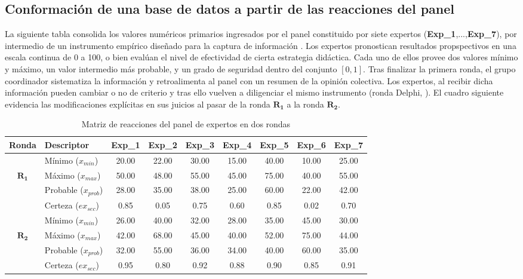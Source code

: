 \documentclass[11pt,a4paper]{article}
\begin{document}
\subsection{Conformación de una base de datos a partir de las reacciones del panel}
La siguiente tabla consolida los valores numéricos primarios ingresados por el panel constituido por siete expertos (\textbf{Exp\_1},...,\textbf{Exp\_7}), por intermedio de un instrumento empírico diseñado para la captura de información \cite{cruz2021}. Los expertos pronostican resultados propspectivos en una escala continua de 0 a 100, o bien evalúan el nivel de efectividad de cierta estrategia didáctica. Cada uno de ellos provee dos valores mínimo y máximo, un valor intermedio más probable, y un grado de seguridad dentro del conjunto $[0,1]$. Tras finalizar la primera ronda, el grupo coordinador sistematiza la información y retroalimenta al panel con un resumen de la opinión colectiva. Los expertos, al recibir dicha información pueden cambiar o no de criterio y tras ello vuelven a diligenciar el mismo instrumento (ronda Delphi, \cite{cruz2009}). El cuadro siguiente evidencia las modificaciones explícitas en sus juicios al pasar de la ronda $\mathbf{R_1}$ a la ronda $\mathbf{R_2}$.

\begin{table}[htbp]
\centering
\small
\begin{tabular}{clccccccc}
\toprule
\textbf{Ronda} & \textbf{Descriptor} & \textbf{Exp\_1} & \textbf{Exp\_2} & \textbf{Exp\_3} & \textbf{Exp\_4} & \textbf{Exp\_5} & \textbf{Exp\_6} & \textbf{Exp\_7} \\
\midrule
& Mínimo ($x_{min}$)    & 20.00 & 22.00 & 30.00 & 15.00 & 40.00 & 10.00 & 25.00 \\
$\mathbf{R_1}$ & Máximo ($x_{max}$)    & 50.00 & 48.00 & 55.00 & 45.00 & 75.00 & 40.00 & 55.00 \\
& Probable ($x_{prob}$)  & 28.00 & 35.00 & 38.00 & 25.00 & 60.00 & 22.00 & 42.00 \\
& Certeza ($ex_{sec}$)   & 0.85  & 0.05  & 0.75  & 0.60  & 0.85  & 0.02  & 0.70  \\
\midrule
& Mínimo ($x_{min}$)    & 26.00 & 40.00 & 32.00 & 28.00 & 35.00 & 45.00 & 30.00 \\
$\mathbf{R_2}$ & Máximo ($x_{max}$)    & 42.00 & 68.00 & 45.00 & 40.00 & 52.00 & 75.00 & 44.00 \\
& Probable ($x_{prob}$)  & 32.00 & 55.00 & 36.00 & 34.00 & 40.00 & 60.00 & 35.00 \\
& Certeza ($ex_{sec}$)   & 0.95  & 0.80  & 0.92  & 0.88  & 0.90  & 0.85  & 0.91  \\
\bottomrule
\end{tabular}
\caption{Matriz de reacciones del panel de expertos en dos rondas}
\end{table}
\end{document}
